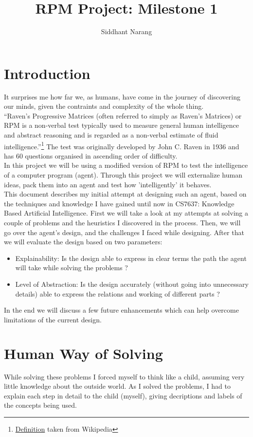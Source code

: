 \documentclass[
	letterpaper, %
]{jdf}
\author{Siddhant Narang}
\title{RPM Project: Milestone 1}
\begin{document}

\maketitle

\section{Introduction}
It surprises me how far we, as humans, have come in the journey of discovering our minds, given the contraints and complexity of the whole thing.
\\“Raven's Progressive Matrices (often referred to simply as Raven's Matrices) or RPM is a non-verbal test typically used to measure general human intelligence and abstract reasoning and is regarded as a non-verbal estimate of fluid intelligence\citep{bilker2012}.”\footnote{\href{https://en.wikipedia.org/wiki/Raven's_Progressive_Matrices}{Definition} taken from Wikipedia}
The test was originally developed by John C. Raven in 1936 \citep{raven1936} and has 60 questions organised in ascending order of difficulty.\\
In this project we will be using a modified version of RPM to test the intelligence of a computer program (agent). Through this project we will externalize human ideas, pack them into an agent and test how 'intelligently' it behaves. \\ This document describes my initial attempt at designing such an agent, based on the techniques and knowledge I have gained until now in CS7637: Knowledge Based Artificial Intelligence. First we will take a look at my attempts at solving a couple of problems and the heuristics I discovered in the process. Then, we will go over the agent's design, and the challenges I faced while designing. After that we will evaluate the design based on two parameters:
\begin{itemize}
	\item Explainability: Is the design able to express in clear terms the path the agent will take while solving the problems ?
	\item Level of Abstraction: Is the design accurately (without going into unnecessary details) able to express the relations and working of different parts ?
\end{itemize}
In the end we will discuss a few future enhancements which can help overcome limitations of the current design.

\section{Human Way of Solving}
While solving these problems I forced myself to think like a child, assuming very little knowledge about the outside world. As I solved the problems, I had to explain each step in detail to the child (myself), giving decriptions and labels of the concepts being used.
\end{document}
